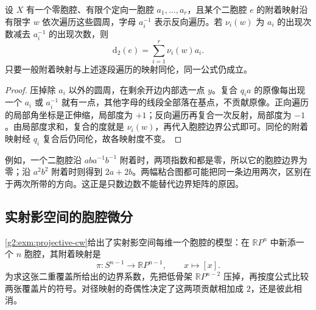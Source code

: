 \begin{proposition}\label{g2:prop:word-boundary-degrees}
	设 \(X\) 有一个零胞腔、有限个定向一胞腔 \(a_1,\ldots,a_r\)，且某个二胞腔 \(e\) 的附着映射沿有限字 \(w\) 依次遍历这些圆周，字母 \(a_i^{-1}\) 表示反向遍历。若 \(\nu_i(w)\) 为 \(a_i\) 的出现次数减去 \(a_i^{-1}\) 的出现次数，则
	\[
		\mathrm{d}_2(e)=\sum_{i=1}^r\nu_i(w)a_i.
	\]
	只要一般附着映射与上述逐段遍历的映射同伦，同一公式仍成立。
\end{proposition}
\begin{proof}
	压掉除 \(a_i\) 以外的圆周，在剩余开边内部选一点 \(y\)。复合 \(q_i a\) 的原像每出现一个 \(a_i\) 或 \(a_i^{-1}\) 就有一点，其他字母的线段全部落在基点，不贡献原像。正向遍历的局部角坐标是正伸缩，局部度为 \(+1\)；反向遍历再复合一次反射，局部度为 \(-1\)。由局部度求和，复合的度就是 \(\nu_i(w)\)，再代入胞腔边界公式即可。同伦的附着映射经 \(q_i\) 复合后仍同伦，故各映射度不变。
\end{proof}

例如，一个二胞腔沿 \(aba^{-1}b^{-1}\) 附着时，两项指数和都是零，所以它的胞腔边界为零；沿 \(a^2b^2\) 附着时则得到 \(2a+2b\)。两幅粘合图都可能把同一条边用两次，区别在于两次所带的方向。这正是只数边数不能替代边界矩阵的原因。

\subsection{实射影空间的胞腔微分}
\label{g2:subsec:0302:04}

\cref{g2:exm:projective-cw}给出了实射影空间每维一个胞腔的模型：在 \(\mathbb RP^n\) 中新添一个 \(n\) 胞腔，其附着映射是
\[
	\pi:S^{n-1}\longrightarrow\mathbb RP^{n-1},\qquad x\longmapsto[x].
\]
为求这张二重覆盖所给出的边界系数，先把低骨架 \(\mathbb RP^{n-2}\) 压掉，再按度公式比较两张覆盖片的符号。对径映射的奇偶性决定了这两项贡献相加成 \(2\)，还是彼此相消。

